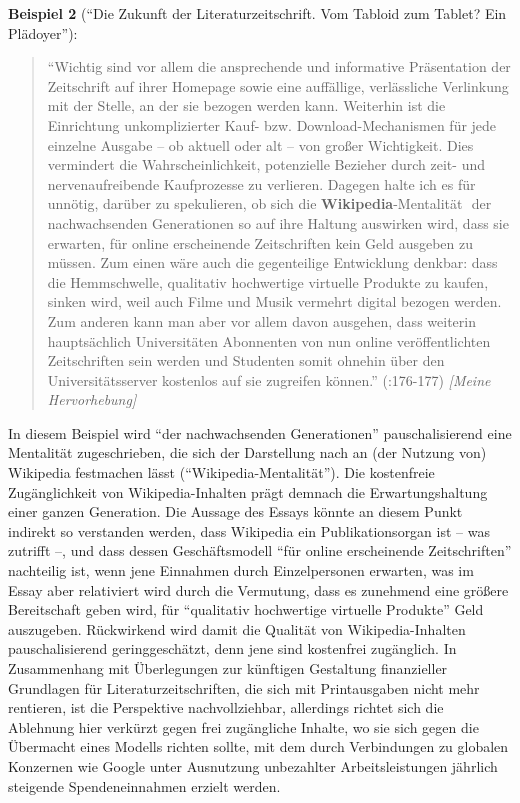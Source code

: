 \documentclass[fontsize=12pt]{scrartcl}
\begin{document}
\textbf{Beispiel 2} ("`Die Zukunft der Literaturzeitschrift. Vom Tabloid zum Tablet? Ein Pl\"adoyer"'):
\singlespacing
\begin{quote}
"`Wichtig sind vor allem die ansprechende und informative Pr\"asentation der Zeitschrift auf ihrer Homepage sowie eine auff\"allige, verl\"assliche Verlinkung mit der Stelle, an der sie bezogen werden kann. Weiterhin ist die Einrichtung unkomplizierter Kauf- bzw. Download-Mechanismen f\"ur jede einzelne Ausgabe -- ob aktuell oder alt -- von gro{\ss}er Wichtigkeit. Dies vermindert die Wahrscheinlichkeit, potenzielle Bezieher durch zeit- und nervenaufreibende Kaufprozesse zu verlieren. Dagegen halte ich es f\"ur unn\"otig, dar\"uber zu spekulieren, ob sich die \flq \textbf{Wi\-ki\-pe\-dia}-Mentalit\"at\frq \,\, der nachwachsenden Generationen so auf ihre Haltung auswirken wird, dass sie erwarten, f\"ur online erscheinende Zeitschriften kein Geld ausgeben zu m\"ussen. Zum einen w\"are auch die gegenteilige Entwicklung denkbar: dass die Hemmschwelle, qualitativ hochwertige virtuelle Produkte zu kaufen, sinken wird, weil auch Filme und Musik vermehrt digital bezogen werden. Zum anderen kann man aber vor allem davon ausgehen, dass weiterin haupts\"achlich Universit\"aten Abonnenten von nun online ver\"of\-fent\-lichten Zeitschriften sein werden und Studenten somit ohnehin \"uber den Universit\"atsserver kostenlos auf sie zugreifen k\"onnen."' (\cite{Arnold2013}:176-177) \textit{[Meine Hervorhebung]}
\end{quote}
\onehalfspacing

In diesem Beispiel wird "`der nachwachsenden Generationen"' pauschalisierend eine Mentalit\"at zugeschrieben, die sich der Darstellung nach an (der Nutzung von) Wi\-ki\-pe\-dia festmachen l\"asst ("`Wi\-ki\-pe\-dia-Mentalit\"at"'). Die kostenfreie Zug\"ang\-lichkeit von Wi\-ki\-pe\-dia-Inhalten pr\"agt demnach die Erwartungshaltung einer ganzen Ge\-ne\-ra\-tion. Die Aussage des Essays k\"onnte an diesem Punkt indirekt so verstanden werden, dass Wi\-ki\-pe\-dia ein Publikationsorgan ist -- was zutrifft --, und dass dessen Gesch\"aftsmodell "`f\"ur online erscheinende Zeitschriften"' nachteilig ist, wenn jene Einnahmen durch Einzelper\-so\-nen erwarten, was im Essay aber relativiert wird durch die Vermutung, dass es zunehmend eine gr\"o{\ss}ere Bereitschaft geben wird, f\"ur "`qualitativ hochwertige virtuelle Produkte"' Geld auszugeben. R\"uckwirkend wird damit die Qualit\"at von Wi\-ki\-pe\-dia-Inhalten pauschalisierend geringgesch\"atzt, denn jene sind kostenfrei zug\"ang\-lich. In Zusammenhang mit \"Uberlegungen zur k\"unftigen Gestaltung finanzieller Grundlagen f\"ur Li\-te\-ra\-tur\-zeitschriften, die sich mit Printausgaben nicht mehr rentieren, ist die Perspektive nachvollziehbar, al\-ler\-dings richtet sich die Ablehnung \mbox{hier} verk\"urzt gegen frei zug\"ang\-liche Inhalte, wo sie sich gegen die \"Uber\-macht eines Modells richten sollte, mit dem durch Verbindungen zu globalen Kon\-zer\-nen wie Google unter Ausnutzung unbezahlter Arbeitsleistungen j\"ahrlich steigende Spendeneinnahmen erzielt werden.
\end{document}
